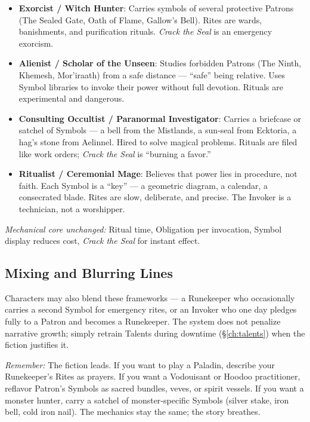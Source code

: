 \begin{tcolorbox}[colback=gray!5!white,colframe=gray!70!black,title=Reskinning the Paths: Runekeeper and Invoker as Familiar Concepts,label=box:reskinning]
    \begin{itemize}
      \item \textbf{Exorcist / Witch Hunter}: Carries symbols of several protective Patrons (The Sealed Gate, Oath of Flame, Gallow’s Bell). Rites are wards, banishments, and purification rituals. \emph{Crack the Seal} is an emergency exorcism.
      \item \textbf{Alienist / Scholar of the Unseen}: Studies forbidden Patrons (The Ninth, Khemesh, Mor’iraath) from a safe distance — “safe” being relative. Uses Symbol libraries to invoke their power without full devotion. Rituals are experimental and dangerous.
      \item \textbf{Consulting Occultist / Paranormal Investigator}: Carries a briefcase or satchel of Symbols — a bell from the Mistlands, a sun‑seal from Ecktoria, a hag’s stone from Aelinnel. Hired to solve magical problems. Rituals are filed like work orders; \emph{Crack the Seal} is “burning a favor.”
      \item \textbf{Ritualist / Ceremonial Mage}: Believes that power lies in procedure, not faith. Each Symbol is a “key” — a geometric diagram, a calendar, a consecrated blade. Rites are slow, deliberate, and precise. The Invoker is a technician, not a worshipper.
    \end{itemize}
    
    \noindent \textit{Mechanical core unchanged:} Ritual time, Obligation per invocation, Symbol display reduces cost, \emph{Crack the Seal} for instant effect.
    
    \subsection*{Mixing and Blurring Lines}
    Characters may also blend these frameworks — a Runekeeper who occasionally carries a second Symbol for emergency rites, or an Invoker who one day pledges fully to a Patron and becomes a Runekeeper. The system does not penalize narrative growth; simply retrain Talents during downtime (\S\ref{ch:talents}) when the fiction justifies it.
    
    \noindent \textit{Remember:} The fiction leads. If you want to play a Paladin, describe your Runekeeper’s Rites as prayers. If you want a Vodouisant or Hoodoo practitioner, reflavor Patron’s Symbols as sacred bundles, veves, or spirit vessels. If you want a monster hunter, carry a satchel of monster‑specific Symbols (silver stake, iron bell, cold iron nail). The mechanics stay the same; the story breathes.
    \end{tcolorbox}
    
